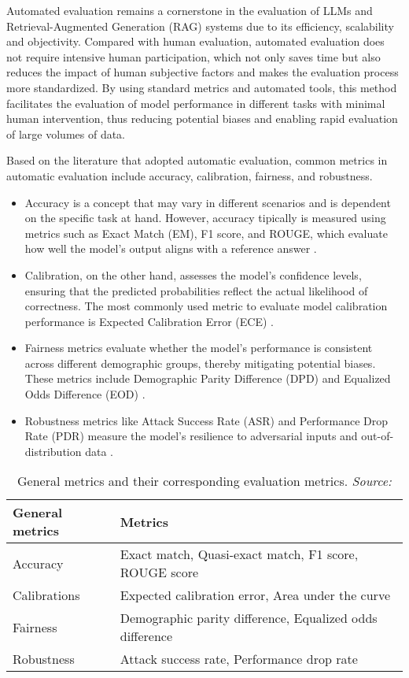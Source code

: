 Automated evaluation remains a cornerstone in the evaluation of LLMs and Retrieval-Augmented Generation (RAG) systems due to its efficiency, scalability and objectivity. Compared with human evaluation, automated evaluation does not require intensive human participation, which not only saves time but also reduces the impact of human subjective factors and makes the evaluation process more standardized. By using standard metrics and automated tools, this method facilitates the evaluation of model performance in different tasks with minimal human intervention, thus reducing potential biases and enabling rapid evaluation of large volumes of data.

Based on the literature that adopted automatic evaluation, common metrics in automatic evaluation include accuracy, calibration, fairness, and robustness.

\begin{itemize}
    \item Accuracy is a concept that may vary in different scenarios and is dependent on the specific task at hand. However, accuracy tipically is measured using metrics such as Exact Match (EM), F1 score, and ROUGE, which evaluate how well the model's output aligns with a reference answer \cite{chang2024survey}.
    \item Calibration, on the other hand, assesses the model’s confidence levels, ensuring that the predicted probabilities reflect the actual likelihood of correctness. The most commonly used metric to evaluate model calibration performance is Expected Calibration Error (ECE) \cite{guo2017calibration}.
    \item Fairness metrics evaluate whether the model's performance is consistent across different demographic groups, thereby mitigating potential biases. These metrics include Demographic Parity Difference (DPD) and Equalized Odds Difference (EOD) \cite{wang2023decodingtrust}.
    \item Robustness metrics like Attack Success Rate (ASR) and Performance Drop Rate (PDR) measure the model's resilience to adversarial inputs and out-of-distribution data \cite{zhu2023promptbench}.
\end{itemize}

\begin{table}[h!]
\centering
\begin{tabular}{|l|l|}
\hline
\textbf{General metrics} & \textbf{Metrics} \\ \hline
Accuracy & Exact match, Quasi-exact match, F1 score, ROUGE score \\ \hline
Calibrations & Expected calibration error, Area under the curve \\ \hline
Fairness & Demographic parity difference, Equalized odds difference \\ \hline
Robustness & Attack success rate, Performance drop rate \\ \hline
\end{tabular}
\caption{General metrics and their corresponding evaluation metrics. \textit{Source:} \cite{chang2024survey}}
\end{table}

